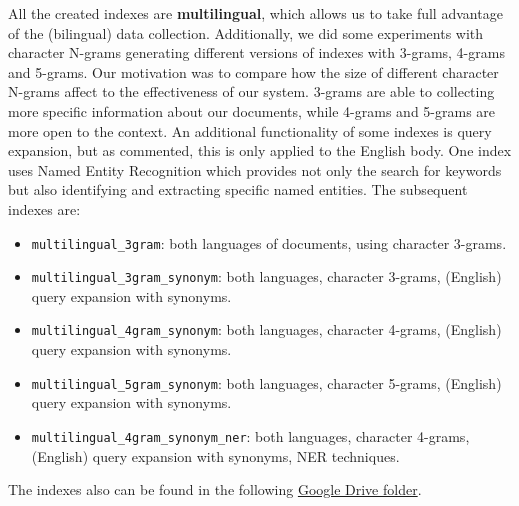 All the created indexes are \textbf{multilingual}, which allows us to take full advantage of the (bilingual) data
collection.
Additionally, we did some experiments with character N-grams generating different versions of indexes with 3-grams,
4-grams and 5-grams.
Our motivation was to compare how the size of different character N-grams affect to the effectiveness of our system.
3-grams are able to collecting more specific information about our documents, while 4-grams and 5-grams are more open to
the context.
An additional functionality of some indexes is query expansion, but as commented, this is only applied to the English
body.
One index uses Named Entity Recognition which provides not only the search for keywords but also identifying and
extracting specific named entities.
The subsequent indexes are:
\begin{itemize}
	\item \texttt{multilingual\_3gram}: both languages of documents, using character 3-grams.
	\item \texttt{multilingual\_3gram\_synonym}: both languages, character 3-grams, (English) query expansion with synonyms.
	\item \texttt{multilingual\_4gram\_synonym}: both languages, character 4-grams, (English) query expansion with synonyms.
	\item \texttt{multilingual\_5gram\_synonym}: both languages, character 5-grams, (English) query expansion with synonyms.
	\item \texttt{multilingual\_4gram\_synonym\_ner}: both languages, character 4-grams, (English) query expansion with synonyms, NER techniques.
\end{itemize}
The indexes also can be found in the following
\href{https://drive.google.com/drive/folders/1CK_kLeZ5Us3VJe8hiG1vhwPrDs94cLvU?usp=share_link}{Google Drive folder}.\\

